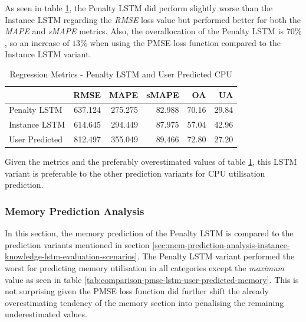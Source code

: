       As seen in table \ref{tab:regression-metrics-pmse-lstm-user-predicted-cpu}, the Penalty LSTM did perform slightly worse than the Instance LSTM regarding the \emph{RMSE} loss value but performed better for both the \emph{MAPE} and \emph{sMAPE} metrics.
      Also, the overallocation of the Penalty LSTM is $70 \%$, so an increase of $13 \%$ when using the PMSE loss function compared to the Instance LSTM variant.

      
      \begin{table}
        \centering
        \caption{Regression Metrics - Penalty LSTM and User Predicted CPU}
        \label{tab:regression-metrics-pmse-lstm-user-predicted-cpu}

        \begin{tabular}{|l|rrrrr|}
          \toprule
          {} &     RMSE &     MAPE &   sMAPE &     OA &     UA \\
          \midrule
          Penalty LSTM   &  637.124 &  275.275 &  82.988 &  70.16 &  29.84 \\
          Instance LSTM   &  614.645 &  294.449 &  87.975 &  57.04 &  42.96 \\
          User Predicted &  812.497 &  355.049 &  89.466 &  72.80 &  27.20 \\
          \bottomrule
        \end{tabular}
      \end{table}

      Given the metrics and the preferably overestimated values of table \ref{tab:regression-metrics-pmse-lstm-user-predicted-cpu}, this LSTM variant is preferable to the other prediction variants for CPU utilisation prediction.

    \subsubsection{Memory Prediction Analysis}
    \label{sec:mem-prediction-analysis-psme-lstm-evaluation}

      In this section, the memory prediction of the Penalty LSTM is compared to the prediction variants mentioned in section \ref{sec:mem-prediction-analysis-instance-knowledge-lstm-evaluation-scenarios}.
      The Penalty LSTM variant performed the worst for predicting memory utilisation in all categories except the \emph{maximum} value as seen in table \ref{tab:comparison-pmse-lstm-user-predicted-memory}.
      This is not surprising given the PMSE loss function did further shift the already overestimating tendency of the memory section into penalising the remaining underestimated values.
      

